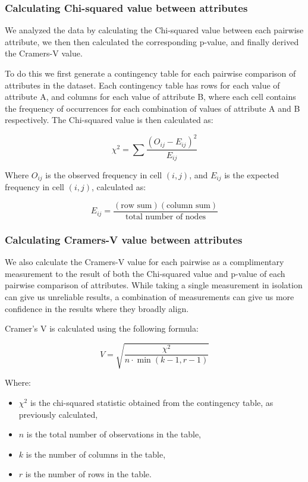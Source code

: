 \documentclass[conference]{IEEEtran}
\begin{document}
\subsubsection{Calculating Chi-squared value between attributes}

We analyzed the data by calculating the Chi-squared value between each pairwise attribute, we then then calculated the corresponding p-value, and finally derived the Cramers-V value.

To do this we first generate a contingency table for each pairwise comparison of attributes in the dataset.  Each contingency table has rows for each value of attribute A, and columns for each value of attribute B, where each cell contains the frequency of occurrences for each combination of values of attribute A and B respectively. The Chi-squared value is then calculated as:

\[
\chi^2 = \sum \frac{(O_{ij} - E_{ij})^2}{E_{ij}}
\]

Where $O_{ij}$ is the observed frequency in cell $(i, j)$, and $E_{ij}$ is the expected frequency in cell $(i, j)$, calculated as:

\[
E_{ij} = \frac{(\text{row sum})(\text{column sum})}{\text{total number of nodes}}
\]

\subsubsection{Calculating Cramers-V value between attributes}

We also calculate the Cramers-V value \cite{akoglu2018user} for each pairwise as a complimentary measurement to the result of both the Chi-squared value and p-value of each pairwise comparison of attributes.  While taking a single measurement in isolation can give us unreliable results, a combination of measurements can give us more confidence in the results where they broadly align.

Cramer's V is calculated using the following formula:

\[ V = \sqrt{\frac{\chi^2}{n \cdot \min(k-1, r-1)}} \]

Where:
\begin{itemize}
    \item $\chi^2$ is the chi-squared statistic obtained from the contingency table, as previously calculated,
    \item $n$ is the total number of observations in the table,
    \item $k$ is the number of columns in the table,
    \item $r$ is the number of rows in the table.
\end{itemize}
\end{document}
